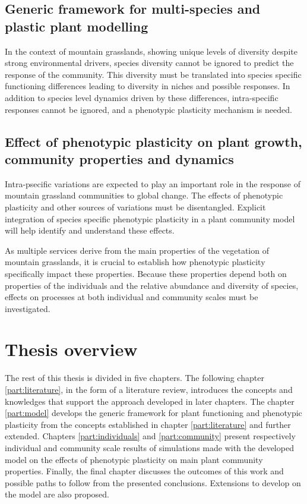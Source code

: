 \subsection{Generic framework for multi-species and plastic plant modelling} %

In the context of mountain grasslands, showing unique levels of diversity despite strong environmental drivers, species diversity cannot be ignored to predict the response of the community. This diversity must be translated into species specific functioning differences leading to diversity in niches and possible responses. In addition to species level dynamics driven by these differences, intra-specific responses cannot be ignored, and a phenotypic plasticity mechanism is needed.




\subsection{Effect of phenotypic plasticity on plant growth, community properties and dynamics}

Intra-psecific variations are expected to play an important role in the response of mountain grassland communities to global change. The effects of phenotypic plasticity and other sources of variations must be disentangled. Explicit integration of species specific phenotypic plasticity in a plant community model will help identify and understand these effects.

As multiple services derive from the main properties of the vegetation of mountain grasslands, it is crucial to establish how phenotypic plasticity specifically impact these properties. Because these properties depend both on properties of the individuals and the relative abundance and diversity of species, effects on processes at both individual and community scales must be investigated.


\section{Thesis overview}

The rest of this thesis is divided in five chapters. The following chapter \ref{part:literature}, in the form of a literature review, introduces the concepts and knowledges that support the approach developed in later chapters. The chapter \ref{part:model} develops the generic framework for plant functioning and phenotypic plasticity from the concepts established in chapter \ref{part:literature} and further extended. Chapters \ref{part:individuals} and \ref{part:community} present respectively individual and community scale results of simulations made with the developed model \model on the effects of phenotypic plasticity on main plant community properties. Finally, the final chapter discusses the outcomes of this work and possible paths to follow from the presented conclusions. Extensions to develop on the model are also proposed.


